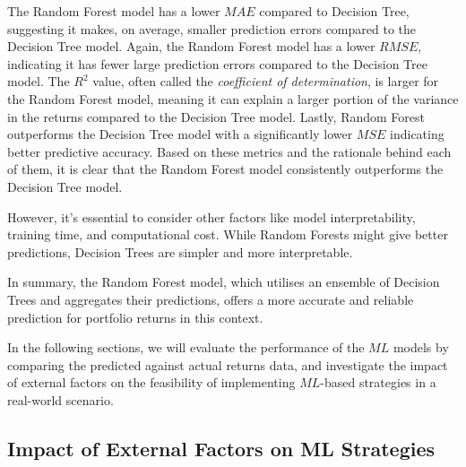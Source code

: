 \documentclass[a4paper,12pt,titlepage]{article}
\numberwithin{equation}{section}
\begin{document}
The Random Forest model has a lower $MAE$ compared to Decision Tree, suggesting it makes, on average, smaller prediction 
errors compared to the Decision Tree model. Again, the Random Forest model has a lower $RMSE$, indicating it has fewer large 
prediction errors compared to the Decision Tree model. The $R^{2}$ value, often called the \textit{coefficient of determination}, is 
larger for the Random Forest model, meaning it can explain a larger portion of the variance in the returns compared to the Decision 
Tree model. Lastly, Random Forest outperforms the Decision Tree model with a significantly lower $MSE$ indicating better predictive 
accuracy. Based on these metrics and the rationale behind each of them, it is clear that the Random Forest model consistently outperforms 
the Decision Tree model. \newline \par \noindent However, it's essential to consider other factors like model interpretability, 
training time, and computational cost. While Random Forests might give better predictions, Decision Trees are simpler and more 
interpretable. \newline \par \noindent In summary, the Random Forest model, which utilises an ensemble of Decision Trees and 
aggregates their predictions, offers a more accurate and reliable prediction for portfolio returns in this 
context. \newline \par \noindent In the following sections, we will evaluate the performance of the $ML$ models by comparing 
the predicted against actual returns data, and investigate the impact of external factors on the feasibility of implementing $ML$-based 
strategies in a real-world scenario. 

\subsection{Impact of External Factors on ML Strategies}
\end{document}
